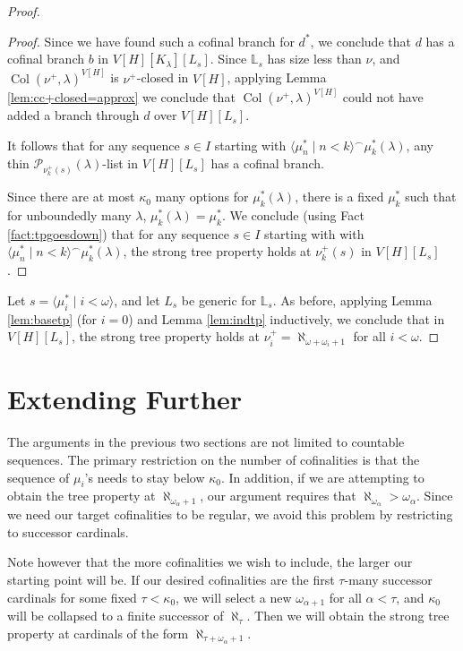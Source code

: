 \documentclass[psamsfonts]{amsart}
\theoremstyle{definition}
\newcommand{\LL}{\mathbb{L}}
\newcommand{\la}{\lambda}
\newcommand{\ka}{\kappa}
\newcommand{\w}{\omega}
\newcommand{\mc}{\mathcal}
\DeclareMathOperator{\Coll}{Col}
\newcommand{\cat}{^\smallfrown}
\numberwithin{equation}{section}
\begin{document}
\begin{proof}
\begin{proof}
		Since we have found such a cofinal branch for $d^*$, we conclude that $d$ has a cofinal branch $b$ in $V[H][K_\la][L_s]$. Since $\LL_s$ has size less than $\nu$, and $\Coll(\nu^+, \la)^{V[H]}$ is $\nu^+$-closed in $V[H]$, applying Lemma \ref{lem:cc+closed=approx} we conclude that $\Coll(\nu^+, \la)^{V[H]}$ could not have added a branch through $d$ over $V[H][L_s]$.
		
		It follows that for any sequence $s\in I$ starting with $\langle \mu^*_n \mid n < k\rangle \cat \mu^*_k(\la)$, any thin $\mc{P}_{\nu_k^+(s)}(\la)$-list in $V[H][L_s]$ has a cofinal branch.
		
		Since there are at most $\ka_0$ many options for $\mu^*_k(\la)$, there is a fixed $\mu^*_k$ such that for unboundedly many $\la$, $\mu^*_k(\la) = \mu^*_k$. We conclude (using Fact \ref{fact:tpgoesdown}) that for any sequence $s\in I$ starting with with $\langle \mu^*_n \mid n < k\rangle \cat \mu^*_k(\la)$, the strong tree property holds at $\nu_k^+(s)$ in $V[H][L_s]$.
	\end{proof}
	
	Let $s = \langle \mu_i^* \mid i < \w\rangle$, and let $L_s$ be generic for $\LL_s$. As before, applying Lemma \ref{lem:basetp} (for $i=0$) and Lemma \ref{lem:indtp} inductively, we conclude that in $V[H][L_s]$, the strong tree property holds at $\nu_i^+ = \aleph_{\w+\w_i+1}$ for all $i<\w$.
\end{proof}

\section{Extending Further}\label{s:extending}

The arguments in the previous two sections are not limited to countable sequences. The primary restriction on the number of cofinalities is that the sequence of $\mu_i$'s needs to stay below $\ka_0$. In addition, if we are attempting to obtain the tree property at $\aleph_{\w_\alpha+1}$, our argument requires that $\aleph_{\w_\alpha} > \w_\alpha$. Since we need our target cofinalities to be regular, we avoid this problem by restricting to successor cardinals.

Note however that the more cofinalities we wish to include, the larger our starting point will be. If our desired cofinalities are the first $\tau$-many successor cardinals for some fixed $\tau < \ka_0$, we will select a new $\w_{\alpha+1}$ for all $\alpha < \tau$, and $\ka_0$ will be collapsed to a finite successor of $\aleph_{\tau}$. Then we will obtain the strong tree property at cardinals of the form $\aleph_{\tau+\w_\alpha+1}$. %
\end{document}
